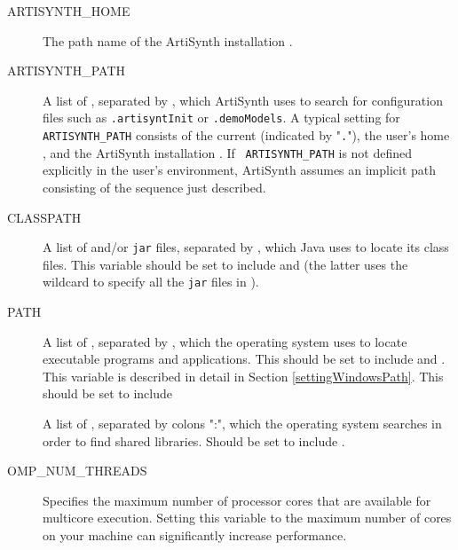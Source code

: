 \begin{description}

\item[ARTISYNTH\_HOME]\mbox{}
 
The path name of the ArtiSynth installation \directory{}.

\item[ARTISYNTH\_PATH]\mbox{}

A list of \directories{}, separated by \separatorDesc, which ArtiSynth
uses to search for configuration files such as {\tt .artisyntInit} or
{\tt .demoModels}.  A typical setting for {\tt ARTISYNTH\_PATH}
consists of the current \directory{} (indicated by "{\tt .}"), the user's
home \directory{}, and the ArtiSynth installation \directory{}. If {\tt
ARTISYNTH\_PATH} is not defined explicitly in the user's environment,
ArtiSynth assumes an implicit path consisting of the \directory{}
sequence just described.

\item[CLASSPATH]\mbox{}

A list of \directories{} and/or {\tt jar} files, separated by
\separatorDesc, which Java uses to locate its class files. This
variable should be set to include 
and  (the latter uses the
wildcard {\tt *} to specify all the {\tt jar} files in 
).

\item[PATH]\mbox{}
 
A list of \directories{}, separated by \separatorDesc, which the
operating system uses to locate executable programs and
applications. 
\ifWindows
This should be set to include  and 
.
This variable is described in detail in Section \ref{settingWindowsPath}.
\else
This should be set to include 
\fi

\ifNeedLibraryPath
\ifWindows\else
\item[\LIBRARYPATH{}]\mbox{}

A list of \directories{}, separated by colons
":", which the operating system searches in order to find shared libraries.
Should be set to include .
\fi
\fi

\item[OMP\_NUM\_THREADS]\mbox{}
 
Specifies the maximum number of processor cores that are available for
multicore execution. Setting this variable to the maximum number of
cores on your machine can significantly increase performance.

\end{description}

